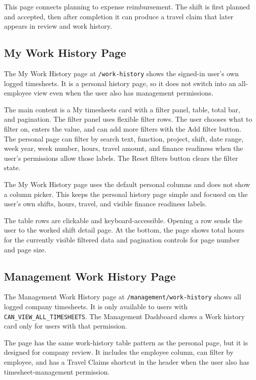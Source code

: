 \documentclass[11pt]{article}
\newcommand{\code}[1]{\nolinkurl{#1}}
\begin{document}
This page connects planning to expense reimbursement. The shift is first planned and accepted, then after completion it can produce a travel claim that later appears in review and work history.

\subsection{My Work History Page}

The My Work History page at \code{/work-history} shows the signed-in user's own logged timesheets. It is a personal history page, so it does not switch into an all-employee view even when the user also has management permissions.

The main content is a My timesheets card with a filter panel, table, total bar, and pagination. The filter panel uses flexible filter rows. The user chooses what to filter on, enters the value, and can add more filters with the Add filter button. The personal page can filter by search text, function, project, shift, date range, week year, week number, hours, travel amount, and finance readiness when the user's permissions allow those labels. The Reset filters button clears the filter state.

The My Work History page uses the default personal columns and does not show a column picker. This keeps the personal history page simple and focused on the user's own shifts, hours, travel, and visible finance readiness labels.

The table rows are clickable and keyboard-accessible. Opening a row sends the user to the worked shift detail page. At the bottom, the page shows total hours for the currently visible filtered data and pagination controls for page number and page size.

\subsection{Management Work History Page}

The Management Work History page at \code{/management/work-history} shows all logged company timesheets. It is only available to users with \code{CAN_VIEW_ALL_TIMESHEETS}. The Management Dashboard shows a Work history card only for users with that permission.

The page has the same work-history table pattern as the personal page, but it is designed for company review. It includes the employee column, can filter by employee, and has a Travel Claims shortcut in the header when the user also has timesheet-management permission.
\end{document}
